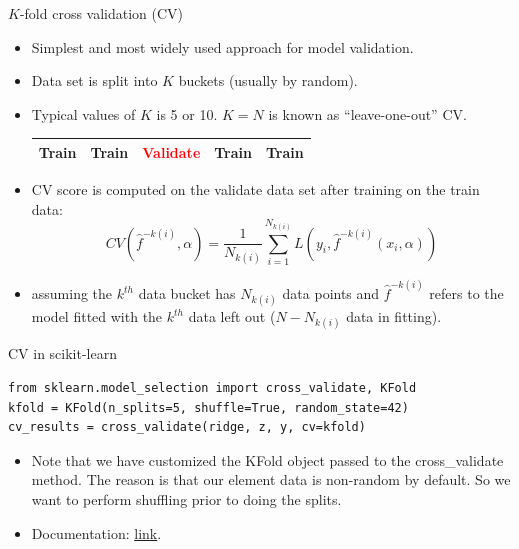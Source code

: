 \documentclass{beamer}
\begin{document}
\begin{frame}{$K$-fold cross validation (CV)}
    \begin{itemize}
        \item Simplest and most widely used approach for model validation.
        \item Data set is split into $K$ buckets (usually by random).
        \item Typical values of $K$ is 5 or 10. $K = N$ is known as ``leave-one-out'' CV.
        \begin{table}
        \begin{tabular}{|p{1.7cm}|p{1.7cm}|p{1.7cm}|p{1.7cm}|p{1.7cm}|}
            \hline
            \Large{Train} & \Large{Train} & \textcolor{red}{\Large{Validate}} & \Large{Train} & \Large{Train}\\
            \hline
        \end{tabular}
        \end{table}
        \item CV score is computed on the validate data set after training on the train data:
        \begin{equation*}
                CV(\hat{f}^{-k(i)},\alpha) = \frac{1}{N_{k(i)}}\sum_{i=1}^{N_{k(i)}} L(y_i, \hat{f}^{-k(i)}(x_i,\alpha))
        \end{equation*}
        \item assuming the $k^{th}$ data bucket has $N_{k(i)}$ data points and $\hat{f}^{-k(i)}$ refers to the model fitted with the $k^{th}$ data left out ($N-N_{k(i)}$ data in fitting).
    \end{itemize}
\end{frame}


\begin{frame}[fragile]{CV in scikit-learn}
\begin{verbatim}
from sklearn.model_selection import cross_validate, KFold
kfold = KFold(n_splits=5, shuffle=True, random_state=42)
cv_results = cross_validate(ridge, z, y, cv=kfold)
\end{verbatim}
\begin{itemize}
    \item Note that we have customized the KFold object passed to the cross\_validate method. The reason is that our element data is non-random by default. So we want to perform shuffling prior to doing the splits.
    \item Documentation: \href{https://scikit-learn.org/stable/modules/generated/sklearn.model_selection.cross_validate.html?highlight=cross_validate#sklearn.model_selection.cross_validate}{link}.
\end{itemize}
\end{frame}
\end{document}
